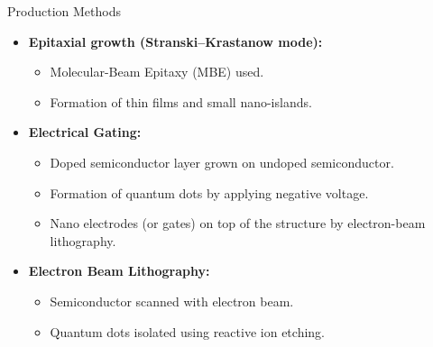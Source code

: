 \documentclass{beamer}
\begin{document}
\begin{frame}{Production Methods}
    \begin{itemize}
        \item \textbf{Epitaxial growth (Stranski–Krastanow mode):}
        \begin{itemize}
            \item Molecular-Beam Epitaxy (MBE) used.
            \item Formation of thin films and small nano-islands.
        \end{itemize}
        \item \textbf{Electrical Gating:}
        \begin{itemize}
            \item Doped semiconductor layer grown on undoped semiconductor.
            \item Formation of quantum dots by applying negative voltage.
            \item Nano electrodes (or gates) on top of the structure by electron-beam lithography.
        \end{itemize}
        \item \textbf{Electron Beam Lithography:}
        \begin{itemize}
            \item Semiconductor scanned with electron beam.
            \item Quantum dots isolated using reactive ion etching.
        \end{itemize}
    \end{itemize}
\end{frame}
\end{document}
